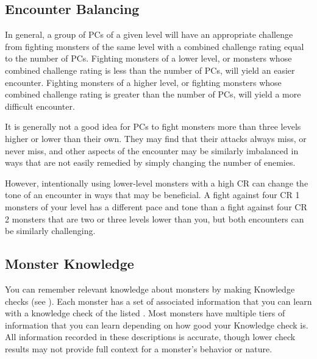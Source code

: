     \subsection{Encounter Balancing}\label{Encounter Balancing}
        In general, a group of PCs of a given level will have an appropriate challenge from fighting monsters of the same level with a combined challenge rating equal to the number of PCs.
        Fighting monsters of a lower level, or monsters whose combined challenge rating is less than the number of PCs, will yield an easier encounter.
        Fighting monsters of a higher level, or fighting monsters whose combined challenge rating is greater than the number of PCs, will yield a more difficult encounter.

        It is generally not a good idea for PCs to fight monsters more than three levels higher or lower than their own.
        They may find that their attacks always miss, or never miss, and other aspects of the encounter may be similarly imbalanced in ways that are not easily remedied by simply changing the number of enemies.

        However, intentionally using lower-level monsters with a high CR can change the tone of an encounter in ways that may be beneficial.
        A fight against four CR 1 monsters of your level has a different pace and tone than a fight against four CR 2 monsters that are two or three levels lower than you, but both encounters can be similarly challenging.

    \subsection{Monster Knowledge}
        You can remember relevant knowledge about monsters by making Knowledge checks (see ).
        Each monster has a set of associated information that you can learn with a knowledge check of the listed .
        Most monsters have multiple tiers of information that you can learn depending on how good your Knowledge check is.
        All information recorded in these descriptions is accurate, though lower check results may not provide full context for a monster's behavior or nature.


